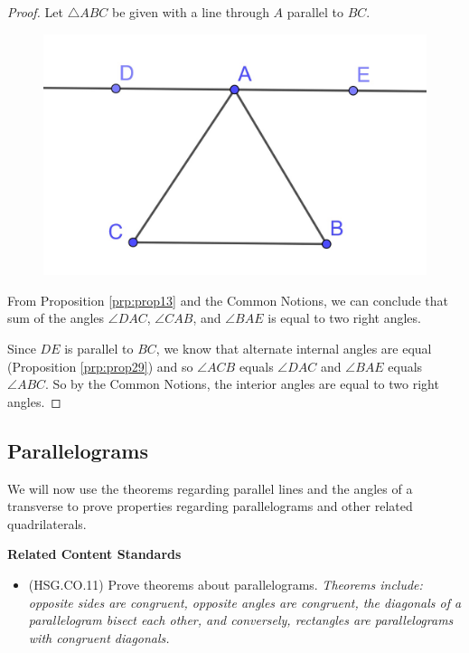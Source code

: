 \documentclass[
]{book}
\providecommand{\tightlist}{%
  \setlength{\itemsep}{0pt}\setlength{\parskip}{0pt}}
\newenvironment{standards}{}{}
\theoremstyle{definition}
\theoremstyle{definition}
\theoremstyle{definition}
\theoremstyle{definition}
\theoremstyle{remark}
\begin{document}
\begin{proof}

Let \(\triangle ABC\) be given with a line through \(A\) parallel to \(BC\).

\begin{figure}

{\centering \includegraphics[width=0.3\linewidth]{images/Angles-triangle} 

}

\end{figure}

From Proposition \ref{prp:prop13} and the Common Notions, we can conclude that sum of the angles \(\angle DAC\), \(\angle CAB\), and \(\angle BAE\) is equal to two right angles.

Since \(DE\) is parallel to \(BC\), we know that alternate internal angles are equal (Proposition \ref{prp:prop29}) and so \(\angle ACB\) equals \(\angle DAC\) and \(\angle BAE\) equals \(\angle ABC\). So by the Common Notions, the interior angles are equal to two right angles.

\end{proof}

\hypertarget{parallelograms}{%
\subsection{Parallelograms}\label{parallelograms}}

We will now use the theorems regarding parallel lines and the angles of a transverse to prove properties regarding parallelograms and other related quadrilaterals.

\begin{standards}

\begin{center}
\textbf{Related Content Standards}

\end{center}

\begin{itemize}
\tightlist
\item
  (HSG.CO.11) Prove theorems about parallelograms. \emph{Theorems include: opposite sides are congruent, opposite angles are congruent, the diagonals of a parallelogram bisect each other, and conversely, rectangles are parallelograms with congruent diagonals.}
\end{itemize}

\end{standards}
\end{document}
